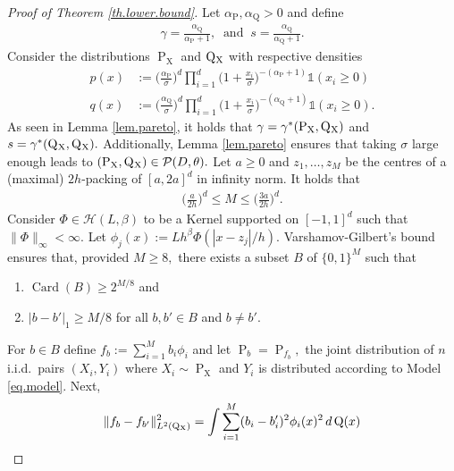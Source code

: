 \documentclass[10pt]{article}
\newcommand{\mH}{\mathcal{H}}
\newcommand{\mP}{\mathcal{P}}
\renewcommand{\P}{\operatorname{P}}
\newcommand{\Q}{\operatorname{Q}}
\newcommand{\card}{\operatorname{Card}}
\newcommand{\sX}{\mathrm{X}}
\begin{document}
\begin{proof}[Proof of Theorem \ref{th.lower.bound}]
    Let $\alpha_{\P}, \alpha_{\Q} >0$ and define
    \begin{align*}
        \gamma = \frac{\alpha_{\Q}}{\alpha_{\P} + 1}, \ \text{ and } \ s = \frac{\alpha_{\Q}}{\alpha_{\Q} + 1}.
    \end{align*}
    Consider the distributions $\P_{\sX}$ and $\Q\mathstrut_{\!\sX}$ with respective densities 
    \begin{align*}
        p(x) &:= \Big(\frac{\alpha_{\P}}{\sigma}\Big)^d\prod_{i=1}^d\Big(1 + \frac{x_i}{\sigma}\Big)^{-(\alpha_{\P} + 1)}\mathds{1}(x_i \geq 0)\\
        q(x) &:= \Big(\frac{\alpha_{\Q}}{\sigma}\Big)^d\prod_{i=1}^d\Big(1 + \frac{x_i}{\sigma}\Big)^{-(\alpha_{\Q} + 1)}\mathds{1}(x_i \geq 0).
    \end{align*}
    As seen in Lemma \ref{lem.pareto}, it holds that $\gamma = \gamma^*(\P_{\sX}, \Q\mathstrut_{\!\sX})$ and $s = \gamma^*(\Q\mathstrut_{\!\sX}, \Q\mathstrut_{\!\sX}).$ Additionally, Lemma \ref{lem.pareto} ensures that taking $\sigma$ large enough leads to $(\P_{\sX}, \Q\mathstrut_{\!\sX}) \in \mP(D, \theta).$
    Let $a \geq 0$ and $z_1, \dots, z_M$ be the centres of a (maximal) $2h$-packing of $[a, 2a]^d$ in infinity norm. It holds that
    \begin{align*}
        \Big(\frac{a}{2h}\Big)^d \leq M \leq \Big(\frac{3a}{2h}\Big)^d.
    \end{align*}
    Consider $\Phi \in \mH(L, \beta)$ to be a Kernel supported on $[-1, 1]^d$ such that $\|\Phi\|_{\infty} <\infty.$ Let $\phi_j(x) := Lh^\beta \Phi(|x - z_j|/h).$ Varshamov-Gilbert's bound \cite[Lemma 2.9]{MR2724359} ensures that, provided $M\geq 8,$ there exists a subset $B$ of $\{0, 1\}^M$ such that 
    \begin{enumerate}
        \item [$(i)$] $\card(B) \geq 2^{M/8}$ and
        \item [$(ii)$] $|b - b'|_1 \geq M/8$ for all $b, b' \in B$ and $b \neq b'.$
    \end{enumerate}
    For $b \in B$ define $f_b := \sum_{i=1}^M b_i \phi_i$ and let $\P_b = \P_{f_b},$ the joint distribution of $n$ i.i.d.\ pairs $(X_i, Y_i)$ where $X_i \sim \P_{\sX}$ and $Y_i$ is distributed according to Model \eqref{eq.model}. Next,
    \begin{align}
    \label{eq.L2Q.bound}
    \begin{split}
        \|f_{b} - f_{b'}\|^2_{L^2(\Q\mathstrut_{\!\sX})} &= \int \sum_{i=1}^M (b_i - b_i')^2\phi_i(x)^2\, d\Q(x)\\

\end{split}
\end{align}
\end{proof}
\end{document}
